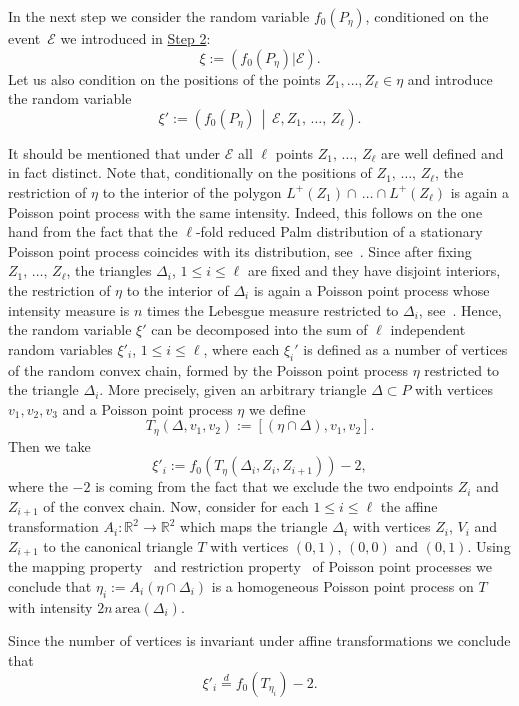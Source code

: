 \documentclass[10pt]{amsart}
\theoremstyle{definition}\newtheorem{defi}[theo]{Definition}\newtheorem{rema}[theo]{Remark}\newtheorem{exam}[theo]{Example}\newtheorem{exem}[theo]{Example}\newtheorem{nota}[theo]{Notation}
\newcommand{\bbR}{\mathbb{R}}
\newcommand{\clE}{\mathcal{E}}
\newcommand{\area}{\mathrm{area}}
\begin{document}
In the next step we consider the random variable $f_0(P_{\eta})$, conditioned on the event~$\clE$ we introduced in \hyperref[step2]{Step 2}:
\[
\xi:=(f_0(P_{\eta})|\clE).
\]
Let us also condition on the positions of the points $Z_1,\dots,Z_\ell \in \eta$ and introduce the random variable
\[
\xi':= \left(f_0(P_{\eta})\,\middle|\,\clE, Z_1,\,\ldots,\,Z_\ell\right).
\]

It should be mentioned that under $\clE$ all $\ell$ points $Z_1,\,\ldots,\,Z_\ell$ are well defined and in fact distinct. Note that, conditionally on the positions of $Z_1,\,\ldots,\,Z_\ell$, the restriction of $\eta$ to the interior of the polygon $L^+(Z_1) \cap \,\dots \cap L^+(Z_\ell)$ is again a Poisson point process with the same intensity. Indeed, this follows on the one hand from the fact that the $\ell$-fold reduced Palm distribution of a stationary Poisson point process coincides with its distribution, see~\cite[Corollary~1]{Hanisch82}. Since after fixing $Z_1,\,\ldots,\,Z_\ell$, the triangles $\Delta_i$, $1\leq i\leq \ell$ are fixed and they have disjoint interiors, the restriction of $\eta$ to the interior of $\Delta_i$ is again a Poisson point process whose intensity measure is $n$ times the Lebesgue measure restricted to $\Delta_i$, see~\cite[Theorem~5.2]{LP}. Hence, the random variable $\xi'$ can be decomposed into the sum of $\ell$ independent random variables $\xi'_i$, $1\leq i\leq \ell$, where each $\xi_i'$ is defined as a number of vertices of the random convex chain, formed by the Poisson point process $\eta$ restricted to the triangle $\Delta_i$. More precisely, given an arbitrary triangle $\Delta\subset P$ with vertices $v_1,v_2,v_3$ and a Poisson point process $\eta$ we define
\[
T_{\eta}(\Delta,v_1,v_2):=[(\eta\cap\Delta), v_1,v_2].
\]
Then we take
\[
\xi'_i:= f_0(T_{\eta}(\Delta_i,Z_i,Z_{i+1}))-2,
\]
where the $-2$ is coming from the fact that we exclude the two endpoints $Z_i$ and $Z_{i+1}$ of the convex chain. Now, consider for each $1\leq i\leq \ell$ the affine transformation $A_i:\bbR^2\to\bbR^2$ which maps the triangle $\Delta_i$ with vertices $Z_i$, $V_i$ and $Z_{i+1}$ to the canonical triangle $T$ with vertices $(0,1)$, $(0,0)$ and $(0,1)$. Using the mapping property~\cite[Theorem~5.1]{LP} and restriction property~\cite[Theorem~5.2]{LP} of Poisson point processes we conclude that $\eta_i:=A_i(\eta\cap\Delta_i)$ is a homogeneous Poisson point process on $T$ with intensity $2n\,{\area}(\Delta_i)$.

Since the number of vertices is invariant under affine transformations we conclude that
\[
\xi'_i\stackrel{d}{=} f_0(T_{\eta_i})-2.
\]
\end{document}

